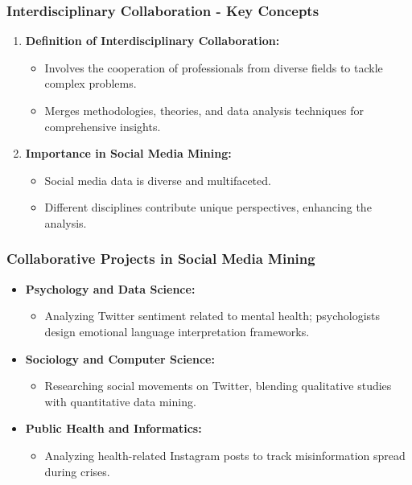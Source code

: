 \documentclass{beamer}
\begin{document}
\begin{frame}[fragile]
    \frametitle{Interdisciplinary Collaboration - Key Concepts}
    \begin{enumerate}
        \item \textbf{Definition of Interdisciplinary Collaboration:}
        \begin{itemize}
            \item Involves the cooperation of professionals from diverse fields to tackle complex problems. 
            \item Merges methodologies, theories, and data analysis techniques for comprehensive insights.
        \end{itemize}

        \item \textbf{Importance in Social Media Mining:}
        \begin{itemize}
            \item Social media data is diverse and multifaceted.
            \item Different disciplines contribute unique perspectives, enhancing the analysis.
        \end{itemize}
    \end{enumerate}
\end{frame}

\begin{frame}[fragile]
    \frametitle{Collaborative Projects in Social Media Mining}
    \begin{itemize}
        \item \textbf{Psychology and Data Science:}
        \begin{itemize}
            \item Analyzing Twitter sentiment related to mental health; psychologists design emotional language interpretation frameworks.
        \end{itemize}

        \item \textbf{Sociology and Computer Science:}
        \begin{itemize}
            \item Researching social movements on Twitter, blending qualitative studies with quantitative data mining.
        \end{itemize}

        \item \textbf{Public Health and Informatics:}
        \begin{itemize}
            \item Analyzing health-related Instagram posts to track misinformation spread during crises.
        \end{itemize}
    \end{itemize}
\end{frame}
\end{document}
